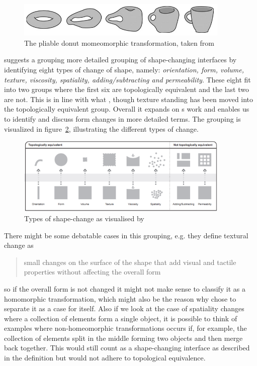 \begin{figure}[hb]
	\centering
  		\includegraphics[width=4in]{figures/pliable-donut}
	\caption[The pliable donut momeomorphic transformation, taken from \citep{coelho2011shape}]
   {The pliable donut momeomorphic transformation, taken from \citep{coelho2011shape}}
   \label{pliable-mug}
\end{figure}   
 
\citeauthor{rasmussen2012shape} suggests a grouping more detailed grouping of shape-changing interfaces by identifying eight types of change of shape, namely: \textit{orientation, form, volume, texture, viscosity, spatiality, adding/subtracting and permeability}.
These eight fit into two groups where the first six are topologically equivalent and the last two are not. This is in line with what \citeauthor{coelho2011shape}, though texture standing has been moved into the topologically equivalent group. Overall it expands on \citeauthor{coelho2011shape}s work and enables us to identify and discuss form changes in more detailed terms.
The grouping is visualized in figure~\ref{types-of-change}, illustrating the different types of change.

\begin{figure}[hb]
	\centering
  		\includegraphics[width=4in]{figures/types-of-change}
	\caption[Types of shape-change as visualised by \citep{rasmussen2012shape}]
   {Types of shape-change as visualised by \citep{rasmussen2012shape}}
   \label{types-of-change}
\end{figure}

There might be some debatable cases in this grouping, e.g. they define textural change as
\begin{quotation}
small changes on the surface of the shape that add visual and tactile properties without affecting the overall form
\end{quotation} 
so if the overall form is not changed it might not make sense to classify it as a homomorphic transformation, which might also be the reason why \citeauthor{coelho2011shape} chose to separate it as a case for itself.
Also if we look at the case of spatiality changes where a collection of elements form a single object, it is possible to think of examples where non-homeomorphic transformations occurs if, for example, the collection of elements split in the middle forming two objects and then merge back together.
This would still count as a shape-changing interface as described in the definition but would not adhere to topological equivalence.   

